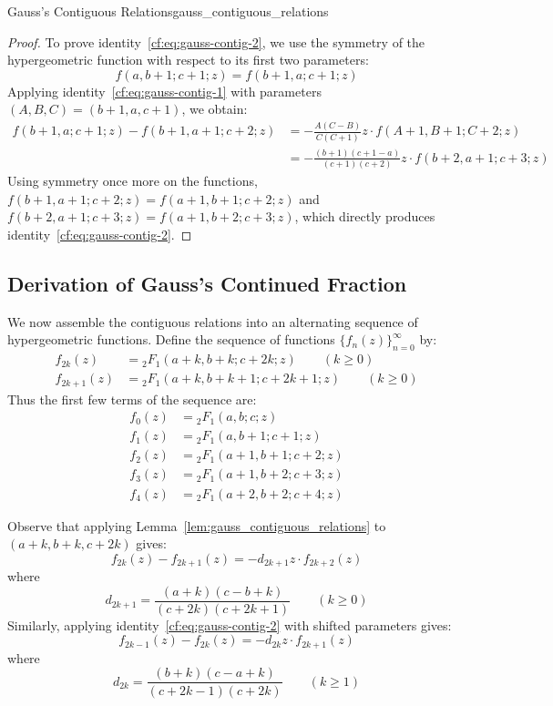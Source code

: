 \documentclass[a4paper]{article}
\begin{document}
\begin{mylemma}{Gauss's Contiguous Relations}{gauss_contiguous_relations}
\begin{proof}
    To prove identity~\eqref{cf:eq:gauss-contig-2}, we use the symmetry of the hypergeometric function with respect to its first two parameters:
    \[
      f(a, b+1; c+1; z) = f(b+1, a; c+1; z)
    \]
    Applying identity~\eqref{cf:eq:gauss-contig-1} with parameters $(A, B, C) = (b+1, a, c+1)$, we obtain:
    \begin{align*}
      f(b+1, a; c+1; z) - f(b+1, a+1; c+2; z) & = -\frac{A(C-B)}{C(C+1)} z \cdot f(A+1, B+1; C+2; z) \\
      & = -\frac{(b+1)(c+1-a)}{(c+1)(c+2)} z \cdot f(b+2, a+1; c+3; z)
    \end{align*}
    Using symmetry once more on the functions, $f(b+1, a+1; c+2; z) = f(a+1, b+1; c+2; z)$ and $f(b+2, a+1; c+3; z) = f(a+1, b+2; c+3; z)$, which directly produces identity~\eqref{cf:eq:gauss-contig-2}.
  \end{proof}
\end{mylemma}

\subsection{Derivation of Gauss's Continued Fraction}\label{cf:subsec:derivation-of-gauss's-continued-fraction}

We now assemble the contiguous relations into an alternating sequence of hypergeometric functions.
Define the sequence of functions $\{f_n(z)\}_{n=0}^\infty$ by:
\begin{align*}
  f_{2k}(z)   & = {_2F_1}(a+k, b+k; c+2k; z) \qquad (k \ge 0) \\
  f_{2k+1}(z) & = {_2F_1}(a+k, b+k+1; c+2k+1; z) \qquad (k \ge 0)
\end{align*}
Thus the first few terms of the sequence are:
\begin{align*}
  f_0(z) & = {_2F_1}(a, b; c; z) \\
  f_1(z) & = {_2F_1}(a, b+1; c+1; z) \\
  f_2(z) & = {_2F_1}(a+1, b+1; c+2; z) \\
  f_3(z) & = {_2F_1}(a+1, b+2; c+3; z) \\
  f_4(z) & = {_2F_1}(a+2, b+2; c+4; z)
\end{align*}

Observe that applying Lemma~\ref{lem:gauss_contiguous_relations} to $(a+k, b+k, c+2k)$ gives:
\[
  f_{2k}(z) - f_{2k+1}(z) = - d_{2k+1} z \cdot f_{2k+2}(z)
\]
where
\[
  d_{2k+1} = \frac{(a+k)(c-b+k)}{(c+2k)(c+2k+1)} \qquad (k \ge 0)
\]
Similarly, applying identity~\eqref{cf:eq:gauss-contig-2} with shifted parameters gives:
\[
  f_{2k-1}(z) - f_{2k}(z) = - d_{2k} z \cdot f_{2k+1}(z)
\]
where
\[
  d_{2k} = \frac{(b+k)(c-a+k)}{(c+2k-1)(c+2k)} \qquad (k \ge 1)
\]
\end{document}
